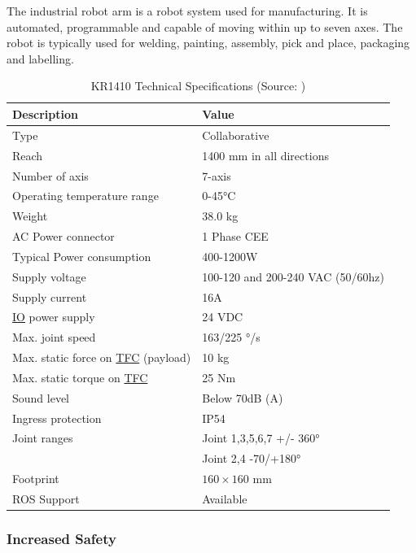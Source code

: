 The industrial robot arm is a robot system used for manufacturing. It is automated, programmable and
capable of moving within up to seven axes.
The robot is typically used for welding, painting, assembly, pick and place, packaging and labelling.
\begin{table}[h!]
    \centering
    \small
    \renewcommand{\arraystretch}{1.2} %
    \begin{tabular}{ll}
        \textbf{Description} & \textbf{Value} \\ \hline
        Type & Collaborative \\
        Reach & 1400 mm in all directions\\
        Number of axis & 7-axis \\
        Operating temperature range & 0-45°C\\ 
        Weight & 38.0 kg \\ 
        AC Power connector & 1 Phase CEE \\ 
        Typical Power consumption & 400-1200W \\ 
        Supply voltage & 100-120 and 200-240 VAC (50/60hz) \\ 
        Supply current & 16A\\ 
        \hyperref[acro:IO]{IO} power supply & 24 VDC\\ 
        Max. joint speed  & 163/225 °/s\\ 
        Max. static force on \hyperref[acro:TFC]{TFC} (payload) & 10 kg\\ 
        Max. static torque on \hyperref[acro:TFC]{TFC} & 25 Nm\\ 
        Sound level & Below 70dB (A) \\ 
        Ingress protection & IP54 \\ 
        Joint ranges & Joint 1,3,5,6,7 +/- 360° \\
        & Joint 2,4 -70/+180° \\ 
        Footprint& $160 \times 160$ mm \\ 
        ROS Support & Available \\ \hline
    \end{tabular}
    \caption{KR1410 Technical Specifications (Source: \cite[page 31]{kassow-specification})}
\end{table}

\subsubsection{Increased Safety}

